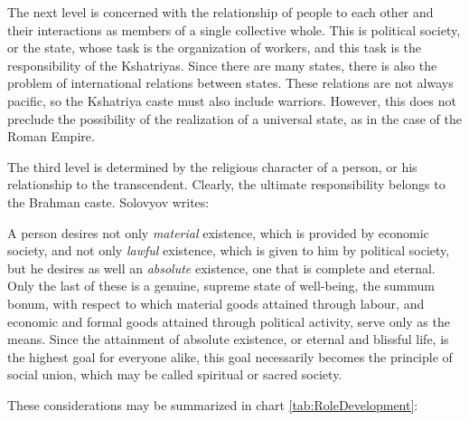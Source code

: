 The next level is concerned with the relationship of people to each other and their interactions as members of a single collective whole. This is political society, or the state, whose task is the organization of workers, and this task is the responsibility of the Kshatriyas. Since there are many states, there is also the problem of international relations between states. These relations are not always pacific, so the Kshatriya caste must also include warriors. However, this does not preclude the possibility of the realization of a universal state, as in the case of the Roman Empire.

The third level is determined by the religious character of a person, or his relationship to the transcendent. Clearly, the ultimate responsibility belongs to the Brahman caste. Solovyov writes:

\begin{quotex}
A person desires not only \emph{material} existence, which is provided by economic society, and not only \emph{lawful} existence, which is given to him by political society, but he desires as well an \emph{absolute} existence, one that is complete and eternal. Only the last of these is a genuine, supreme state of well-being, the summum bonum, with respect to which material goods attained through labour, and economic and formal goods attained through political activity, serve only as the means. Since the attainment of absolute existence, or eternal and blissful life, is the highest goal for everyone alike, this goal necessarily becomes the principle of social union, which may be called spiritual or sacred society. 

\end{quotex}
These considerations may be summarized in chart \ref{tab:RoleDevelopment}:

